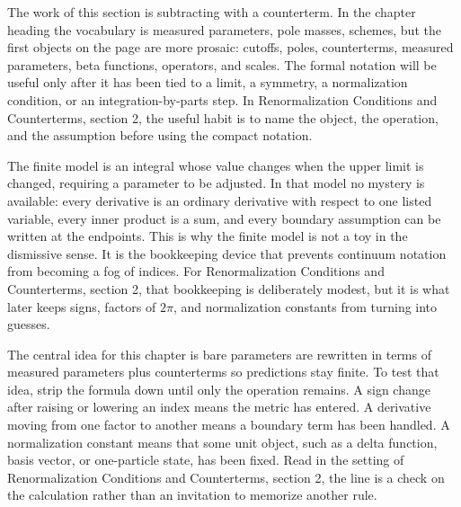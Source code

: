 











The work of this section is subtracting with a counterterm.  In the chapter heading the vocabulary is measured parameters, pole masses, schemes, but the first objects on the page are more prosaic: cutoffs, poles, counterterms, measured parameters, beta functions, operators, and scales.  The formal notation will be useful only after it has been tied to a limit, a symmetry, a normalization condition, or an integration-by-parts step.  In Renormalization Conditions and Counterterms, section 2, the useful habit is to name the object, the operation, and the assumption before using the compact notation.

The finite model is an integral whose value changes when the upper limit is changed, requiring a parameter to be adjusted.  In that model no mystery is available: every derivative is an ordinary derivative with respect to one listed variable, every inner product is a sum, and every boundary assumption can be written at the endpoints.  This is why the finite model is not a toy in the dismissive sense.  It is the bookkeeping device that prevents continuum notation from becoming a fog of indices.  For Renormalization Conditions and Counterterms, section 2, that bookkeeping is deliberately modest, but it is what later keeps signs, factors of \(2\pi\), and normalization constants from turning into guesses.

The central idea for this chapter is bare parameters are rewritten in terms of measured parameters plus counterterms so predictions stay finite.  To test that idea, strip the formula down until only the operation remains.  A sign change after raising or lowering an index means the metric has entered.  A derivative moving from one factor to another means a boundary term has been handled.  A normalization constant means that some unit object, such as a delta function, basis vector, or one-particle state, has been fixed.  Read in the setting of Renormalization Conditions and Counterterms, section 2, the line is a check on the calculation rather than an invitation to memorize another rule.

